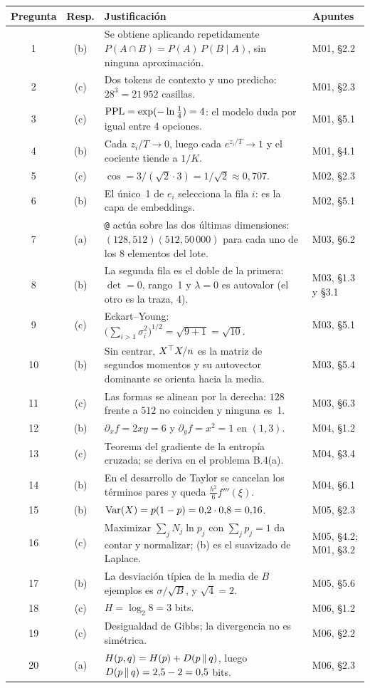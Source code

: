 \begin{center}
\small
\renewcommand{\arraystretch}{1.12}
\begin{tabularx}{\textwidth}{@{}c c >{\raggedright\arraybackslash}X >{\raggedright\arraybackslash}p{2.6cm}@{}}
\toprule
Pregunta & Resp. & Justificación & Apuntes \\
\midrule
1 & (b) & Se obtiene aplicando repetidamente $P(A\cap B)=P(A)\,P(B\mid A)$, sin ninguna aproximación. & M01, §2.2 \\
2 & (c) & Dos tokens de contexto y uno predicho: $28^{3}=21\,952$ casillas. & M01, §2.3 \\
3 & (c) & $\operatorname{PPL}=\exp(-\ln\tfrac14)=4$: el modelo duda por igual entre 4 opciones. & M01, §5.1 \\
4 & (b) & Cada $z_i/T\to 0$, luego cada $e^{z_i/T}\to 1$ y el cociente tiende a $1/K$. & M01, §4.1 \\
5 & (c) & $\cos=3/(\sqrt2\cdot 3)=1/\sqrt2\approx 0{,}707$. & M02, §2.3 \\
6 & (b) & El único~1 de $e_i$ selecciona la fila $i$: es la capa de embeddings. & M02, §5.1 \\
7 & (a) & \texttt{@} actúa sobre las dos últimas dimensiones: $(128,512)(512,50\,000)$ para cada uno de los 8 elementos del lote. & M03, §6.2 \\
8 & (b) & La segunda fila es el doble de la primera: $\det=0$, rango~1 y $\lambda=0$ es autovalor (el otro es la traza, 4). & M03, §1.3 y §3.1 \\
9 & (c) & Eckart--Young: $\big(\sum_{i>1}\sigma_i^{2}\big)^{1/2}=\sqrt{9+1}=\sqrt{10}$. & M03, §5.1 \\
10 & (b) & Sin centrar, $X^{\top} X/n$ es la matriz de segundos momentos y su autovector dominante se orienta hacia la media. & M03, §5.4 \\
11 & (c) & Las formas se alinean por la derecha: $128$ frente a $512$ no coinciden y ninguna es~1. & M03, §6.3 \\
12 & (b) & $\partial_x f=2xy=6$ y $\partial_y f=x^{2}=1$ en $(1,3)$. & M04, §1.2 \\
13 & (c) & Teorema del gradiente de la entropía cruzada; se deriva en el problema B.4(a). & M04, §3.4 \\
14 & (b) & En el desarrollo de Taylor se cancelan los términos pares y queda $\tfrac{h^{2}}{6}f'''(\xi)$. & M04, §6.1 \\
15 & (b) & $\operatorname{Var}(X)=p(1-p)=0{,}2\cdot 0{,}8=0{,}16$. & M05, §2.3 \\
16 & (c) & Maximizar $\sum_j N_j\ln p_j$ con $\sum_j p_j=1$ da contar y normalizar; (b) es el suavizado de Laplace. & M05, §4.2; M01, §3.2 \\
17 & (b) & La desviación típica de la media de $B$ ejemplos es $\sigma/\sqrt B$, y $\sqrt4=2$. & M05, §5.6 \\
18 & (c) & $H=\log_2 8=3$ bits. & M06, §1.2 \\
19 & (c) & Desigualdad de Gibbs; la divergencia no es simétrica. & M06, §2.2 \\
20 & (a) & $H(p,q)=H(p)+D(p\,\|\,q)$, luego $D(p\,\|\,q)=2{,}5-2=0{,}5$ bits. & M06, §2.3 \\
\bottomrule
\end{tabularx}
\end{center}


